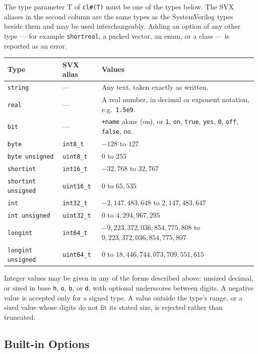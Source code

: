 \documentclass[11pt,letterpaper]{report}
\begin{document}
The type parameter T of \texttt{cl\#(T)} must be one of the types below. The SVX aliases in the second column are the same types as the SystemVerilog types beside them and may be used interchangeably. Adding an option of any other type --- for example \texttt{shortreal}, a packed vector, an enum, or a class --- is reported as an error.

\begin{xltabular}{\linewidth}{>{\small}p{1.3in} >{\small}p{0.75in} >{\small}X}
\toprule
\textbf{Type} & \textbf{SVX alias} & \textbf{Values} \\
\midrule
\endhead
\bottomrule
\endfoot
\texttt{string} & --- & Any text, taken exactly as written. \\
\texttt{real} & --- & A real number, in decimal or exponent notation, e.g.\ \texttt{1.5e9}. \\
\texttt{bit} & --- & \texttt{+name} alone (on), or \texttt{1}, \texttt{on}, \texttt{true}, \texttt{yes}, \texttt{0}, \texttt{off}, \texttt{false}, \texttt{no}. \\
\texttt{byte} & \texttt{int8\_t} & $-128$ to $127$ \\
\texttt{byte unsigned} & \texttt{uint8\_t} & $0$ to $255$ \\
\texttt{shortint} & \texttt{int16\_t} & $-32{,}768$ to $32{,}767$ \\
\texttt{shortint unsigned} & \texttt{uint16\_t} & $0$ to $65{,}535$ \\
\texttt{int} & \texttt{int32\_t} & $-2{,}147{,}483{,}648$ to $2{,}147{,}483{,}647$ \\
\texttt{int unsigned} & \texttt{uint32\_t} & $0$ to $4{,}294{,}967{,}295$ \\
\texttt{longint} & \texttt{int64\_t} & $-9{,}223{,}372{,}036{,}854{,}775{,}808$ to $9{,}223{,}372{,}036{,}854{,}775{,}807$ \\
\texttt{longint unsigned} & \texttt{uint64\_t} & $0$ to $18{,}446{,}744{,}073{,}709{,}551{,}615$ \\
\end{xltabular}

Integer values may be given in any of the forms described above: unsized decimal, or sized in base \texttt{h}, \texttt{o}, \texttt{b}, or \texttt{d}, with optional underscores between digits. A negative value is accepted only for a signed type. A value outside the type's range, or a sized value whose digits do not fit its stated size, is rejected rather than truncated.

\subsection*{Built-in Options}
\end{document}
